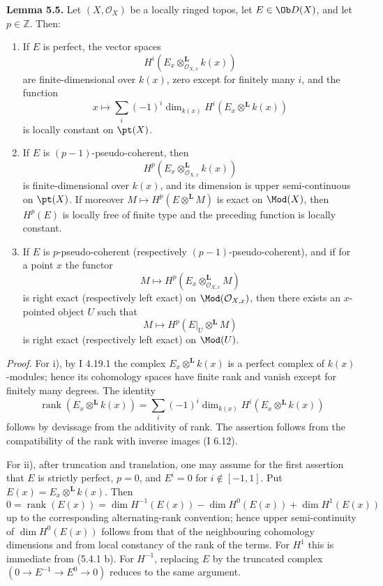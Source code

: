 \documentclass[11pt]{article}
\providecommand{\rank}{\operatorname{rank}}
\begin{document}
\textbf{Lemma 5.5.} Let \((X,\mathcal O_X)\) be a locally ringed topos, let \(E\in\Ob D(X)\), and let \(p\in\mathbb Z\). Then:
\begin{enumerate}[label=\roman*)]
\item If \(E\) is perfect, the vector spaces
\[
 H^i(E_x\otimes_{\mathcal O_{X,x}}^{\mathbf L}k(x))
\]
are finite-dimensional over \(k(x)\), zero except for finitely many \(i\), and the function
\[
 x\longmapsto
 \sum_i(-1)^i\dim_{k(x)}H^i(E_x\otimes^{\mathbf L}k(x))
\]
is locally constant on \(\pt(X)\).
\item If \(E\) is \((p-1)\)-pseudo-coherent, then
\[
 H^p(E_x\otimes_{\mathcal O_{X,x}}^{\mathbf L}k(x))
\]
is finite-dimensional over \(k(x)\), and its dimension is upper semi-continuous on \(\pt(X)\). If moreover \(M\mapsto H^p(E\otimes^{\mathbf L}M)\) is exact on \(\Mod(X)\), then \(H^p(E)\) is locally free of finite type and the preceding function is locally constant.
\item If \(E\) is \(p\)-pseudo-coherent (respectively \((p-1)\)-pseudo-coherent), and if for a point \(x\) the functor
\[
 M\longmapsto H^p(E_x\otimes_{\mathcal O_{X,x}}^{\mathbf L}M)
\]
is right exact (respectively left exact) on \(\Mod(\mathcal O_{X,x})\), then there exists an \(x\)-pointed object \(U\) such that
\[
 M\longmapsto H^p(E|_U\otimes^{\mathbf L}M)
\]
is right exact (respectively left exact) on \(\Mod(U)\).
\end{enumerate}

\emph{Proof.} For i), by I 4.19.1 the complex \(E_x\otimes^{\mathbf L}k(x)\) is a perfect complex of \(k(x)\)-modules; hence its cohomology spaces have finite rank and vanish except for finitely many degrees. The identity
\[
 \rank(E_x\otimes^{\mathbf L}k(x))
 =\sum_i(-1)^i\dim_{k(x)}H^i(E_x\otimes^{\mathbf L}k(x))
\]
follows by devissage from the additivity of rank. The assertion follows from the compatibility of the rank with inverse images (I 6.12).

For ii), after truncation and translation, one may assume for the first assertion that \(E\) is strictly perfect, \(p=0\), and \(E^i=0\) for \(i\notin[-1,1]\). Put \(E(x)=E_x\otimes^{\mathbf L}k(x)\). Then
\[
 0=\rank(E(x))
 =\dim H^{-1}(E(x))-\dim H^0(E(x))+\dim H^1(E(x))
\]
up to the corresponding alternating-rank convention; hence upper semi-continuity of \(\dim H^0(E(x))\) follows from that of the neighbouring cohomology dimensions and from local constancy of the rank of the terms. For \(H^1\) this is immediate from (5.4.1 b). For \(H^{-1}\), replacing \(E\) by the truncated complex \((0\to E^{-1}\to E^0\to0)\) reduces to the same argument.
\end{document}
